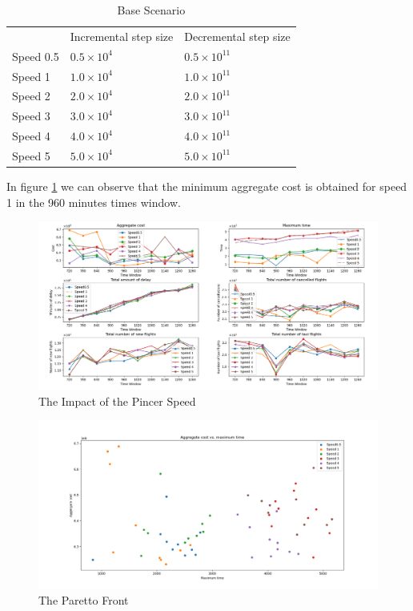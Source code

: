 	\begin{table}[h!]
		\centering
		\caption{Base Scenario}
		\label{tbl:pincerSpeed}
		\begin{tabular}{lll}
			\hline
			& Incremental step size     & Decremental step size      \\
			Speed 0.5 & $0.5 \times 10^{4}$ & $0.5 \times 10^{11}$ \\
			Speed 1   & $1.0 \times 10^{4}$ & $1.0 \times 10^{11}$ \\
			Speed 2   & $2.0 \times 10^{4}$ & $2.0 \times 10^{11}$ \\
			Speed 3   & $3.0 \times 10^{4}$ & $3.0 \times 10^{11}$ \\
			Speed 4   & $4.0 \times 10^{4}$ & $4.0 \times 10^{11}$ \\
			Speed 5   & $5.0 \times 10^{4}$ & $5.0 \times 10^{11}$ \\
			\hline
		\end{tabular}
	\end{table} 

In figure \ref{fig:speed} we can observe that the minimum aggregate cost is obtained for speed 1 in the 960 minutes times window.	
	\begin{figure}[h!]
		\centering
		\includegraphics[width=\textwidth]{figures/speed2x3.png}
		\caption[]{The Impact of the Pincer Speed}
		\label{fig:speed}
	\end{figure}

	\begin{figure}[h!]
		\centering
		\includegraphics[width=\textwidth]{figures/costTime.png}
		\caption[]{The Paretto Front}
		\label{fig:costTime}
	\end{figure}



